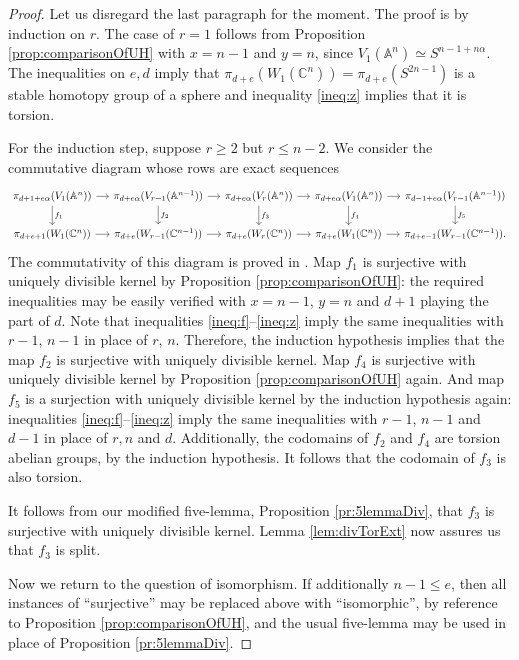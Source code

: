 \documentclass[11pt, oneside, dvipsnames, svgnames, table, final]{amsart}
\newcommand{\mathbx}[1]{\mathbb{#1}}
\theoremstyle{plain}
\theoremstyle{definition}
\theoremstyle{remark}
\newcommand{\C}{\mathbx{C}}
\newcommand{\A}{\mathbx{A}}
\newcommand{\weq}{\simeq}
\newcommand{\<}[1]{{\langle}#1 {\rangle}}
\begin{document}
\begin{proof}
  Let us disregard the last paragraph for the moment. The proof is by induction on $r$. The case of $r=1$ follows from Proposition \ref{prop:comparisonOfUH} with $x=n-1$ and $y=n$, since $V_1(\A^n) \weq S^{n-1+n\alpha}$. The inequalities on $e,d$ imply that $\pi_{d+e}(W_1(\C^n))= \pi_{d+e}(S^{2n-1})$ is a stable homotopy group of a sphere and inequality \ref{ineq:z} implies that it is torsion.

  For the induction step, suppose $r \ge 2$ but $r \le n-2$. We consider the commutative diagram whose rows are exact sequences
{\small  \begin{equation}\label{eq:diagram}
    \begin{tikzcd}[column sep = small]
      \pi_{d+1+e\alpha}(V_1(\A^n)) \rar \dar{f_1} & \pi_{d+e\alpha}(V_{r-1}(\A^{n-1})) \rar \dar{f_2} & \pi_{d+e\alpha}(V_r(\A^n)) \rar \dar{f_3} & \pi_{d+e\alpha}(V_1(\A^n))  \dar{f_4} \rar & \pi_{d-1+e\alpha}(V_{r-1}(\A^{n-1})) \dar{f_5}  \\
      \pi_{d+e+1}(W_1(\C^n)) \rar  & \pi_{d+e}(W_{r-1}(\C^{n-1})) \rar  & \pi_{d+e}(W_r(\C^n)) \rar  & \pi_{d+e}(W_1(\C^n))\rar & \pi_{d+e-1}(W_{r-1}(\C^{n-1})).
    \end{tikzcd}
  \end{equation}}
The commutativity of this diagram is proved in \cite[Prop.\ 5.1]{Gant2025}. Map $f_1$ is surjective with uniquely divisible kernel by Proposition \ref{prop:comparisonOfUH}: the required inequalities may be easily verified with $x=n-1$, $y=n$ and $d+1$ playing the part of $d$. Note that inequalities \ref{ineq:f}--\ref{ineq:z} imply the same inequalities with $r-1$, $n-1$ in place of $r$, $n$. Therefore, the induction hypothesis implies that the map $f_2$ is surjective with uniquely divisible kernel. Map $f_4$ is surjective with uniquely divisible kernel by Proposition \ref{prop:comparisonOfUH} again. And map $f_5$ is a surjection with uniquely divisible kernel by the induction hypothesis again: inequalities \ref{ineq:f}--\ref{ineq:z} imply the same inequalities with $r-1$, $n-1$ and $d-1$ in place of $r,n$ and $d$. Additionally, the codomains of $f_2$ and $f_4$ are torsion abelian groups, by the induction hypothesis. It follows that the codomain of $f_3$ is also torsion.

  It follows from our modified five-lemma, Proposition \ref{pr:5lemmaDiv}, that $f_3$ is surjective with uniquely divisible kernel. Lemma \ref{lem:divTorExt} now assures us that $f_3$ is split. 
  
  Now we return to the question of isomorphism.
  If additionally $n-1 \le e$, then all instances of ``surjective'' may be replaced above with ``isomorphic'', by reference to Proposition \ref{prop:comparisonOfUH}, and the usual five-lemma may be used in place of Proposition \ref{pr:5lemmaDiv}. 
\end{proof}
\end{document}
